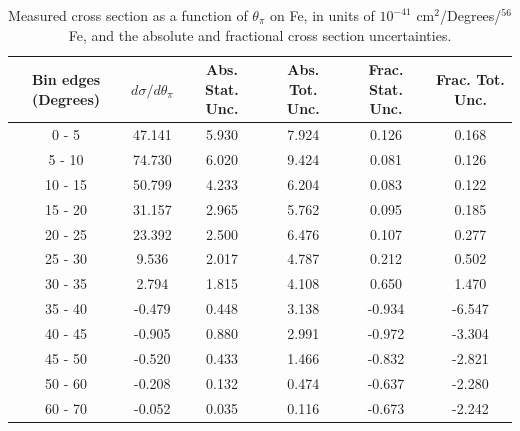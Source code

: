 \documentclass[aps,prl,twocolumn,superscriptaddress,nofootinbib]{revtex4-1}
\begin{document}
\begin{table}[h!]
  \centering
  \caption{Measured cross section as a function of $\theta_{\pi}$ on Fe, in units of
  $10^{-41}$ $\text{cm}^{2}$/Degrees/$^{56}$Fe, and the absolute and
  fractional cross section uncertainties.}
    \begin{tabular}{c||c||c|c||c|c}
      Bin edges (Degrees)  &  $d\sigma/d\theta_{\pi}$  &  Abs. Stat. Unc. & Abs. Tot. Unc.  &  Frac. Stat. Unc.  &  Frac. Tot. Unc. \\
      \hline\hline
        0 - 5 & 47.141 & 5.930 & 7.924 & 0.126 & 0.168 \\
       5 - 10 & 74.730 & 6.020 & 9.424 & 0.081 & 0.126 \\
      10 - 15 & 50.799 & 4.233 & 6.204 & 0.083 & 0.122 \\
      15 - 20 & 31.157 & 2.965 & 5.762 & 0.095 & 0.185 \\
      20 - 25 & 23.392 & 2.500 & 6.476 & 0.107 & 0.277 \\
      25 - 30 & 9.536 & 2.017 & 4.787 & 0.212 & 0.502 \\
      30 - 35 & 2.794 & 1.815 & 4.108 & 0.650 & 1.470 \\
      35 - 40 & -0.479 & 0.448 & 3.138 & -0.934 & -6.547 \\
      40 - 45 & -0.905 & 0.880 & 2.991 & -0.972 & -3.304 \\
      45 - 50 & -0.520 & 0.433 & 1.466 & -0.832 & -2.821 \\
      50 - 60 & -0.208 & 0.132 & 0.474 & -0.637 & -2.280 \\
      60 - 70 & -0.052 & 0.035 & 0.116 & -0.673 & -2.242 \\
    \end{tabular}
  \label{table:ThetaPiXSec_Fe}
\end{table}
\end{document}
